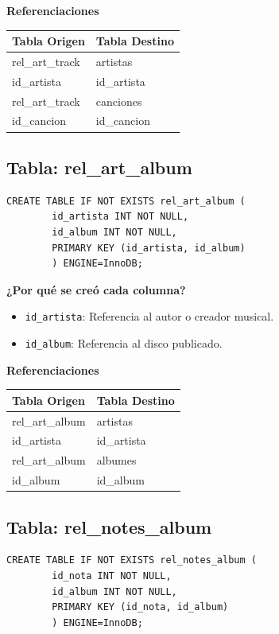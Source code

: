 \documentclass[11pt]{article}
\begin{document}
	\vspace{0.3cm}
	\noindent\textbf{Referenciaciones} \\[0.3em]
	\begin{tabular}{|l|l|}
		\hline
		\textbf{Tabla Origen} & \textbf{Tabla Destino} \\
		\hline
		rel\_art\_track & artistas \\
		id\_artista & id\_artista \\
		\hline
		rel\_art\_track & canciones \\
		id\_cancion & id\_cancion \\
		\hline
	\end{tabular}
	
	\vspace{0.5cm}
	
	\subsection{Tabla: rel\_art\_album}
	\begin{lstlisting}[style=sqlstyle]
		CREATE TABLE IF NOT EXISTS rel_art_album (
		id_artista INT NOT NULL,
		id_album INT NOT NULL,
		PRIMARY KEY (id_artista, id_album)
		) ENGINE=InnoDB;
	\end{lstlisting}
	
	\noindent\textbf{¿Por qué se creó cada columna?}
	\begin{itemize}[noitemsep,topsep=2pt]
		\item \texttt{id\_artista}: Referencia al autor o creador musical.
		\item \texttt{id\_album}: Referencia al disco publicado.
	\end{itemize}
	
	\vspace{0.3cm}
	\noindent\textbf{Referenciaciones} \\[0.3em]
	\begin{tabular}{|l|l|}
		\hline
		\textbf{Tabla Origen} & \textbf{Tabla Destino} \\
		\hline
		rel\_art\_album & artistas \\
		id\_artista & id\_artista \\
		\hline
		rel\_art\_album & albumes \\
		id\_album & id\_album \\
		\hline
	\end{tabular}
	
	\vspace{0.5cm}
	
	\subsection{Tabla: rel\_notes\_album}
	\begin{lstlisting}[style=sqlstyle]
		CREATE TABLE IF NOT EXISTS rel_notes_album (
		id_nota INT NOT NULL,
		id_album INT NOT NULL,
		PRIMARY KEY (id_nota, id_album)
		) ENGINE=InnoDB;
	\end{lstlisting}
	
\end{document}
